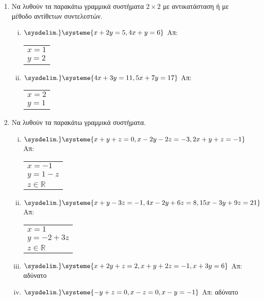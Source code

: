 \documentclass[a4paper,table]{report}
\begin{document}
\begin{center}
  \minibox{\large \bfseries \textcolor{Col1}{Ασκήσεις στα Γραμμικά Συστήματα}}
\end{center}

\vspace{\baselineskip}

\begin{enumerate}

  \item Να λυθούν τα παρακάτω γραμμικά συστήματα $ 2 \times 2 $ με αντικατάσταση ή με 
    μέθοδο αντίθετων συντελεστών.

    \begin{enumerate}[i)]
      \item $ 
      \sysdelim.\}
      \systeme{
        x + 2y = 5, 
        4x + y = 6
      } $ 
      \hfill Απ: 
      \begin{tabular}{l}  
        $x=1 $ \\ 
        $y=2 $ 
      \end{tabular}

    \item $ 
    \sysdelim.\}
    \systeme{
      4x+3y=11,
      5x+7y=17
    } $ 
    \hfill Απ: 
    \begin{tabular}{l}  
      $x=2 $ \\ 
      $y=1 $ 
    \end{tabular}
\end{enumerate}

  \item Να λυθούν τα παρακάτω γραμμικά συστήματα.

    \begin{enumerate}[i)]
      \item $ 
      \sysdelim.\}
      \systeme{
        x+y+z=0,
        x-2y-2z=-3,
        2x+y+z=-1
      } $ 
      \hfill Απ: \begin{tabular}{l}  
        $x=-1 $ \\ 
        $ y=1-z $ \\
        $z \in \mathbb{R}  $
      \end{tabular}

    \item $ 
    \sysdelim.\}
    \systeme{
      x+y-3z=-1,
      4x-2y+6z=8,
      15x-3y+9z=21
    } $ 
    \hfill Απ: \begin{tabular}{l}  
      $x=1 $ \\ 
      $ y=-2+3z $ \\
      $z \in \mathbb{R}  $
    \end{tabular}

  \item $ 
  \sysdelim.\}
  \systeme{
    x+2y+z=2,
    x+y+2z=-1,
    x+3y=6
  } $ 
  \hfill Απ: αδύνατο 

\item $ 
\sysdelim.\}
\systeme{
  -y+z=0,
  x-z=0,
  x-y=-1
} $ 
\hfill Απ: αδύνατο 

\end{enumerate}
\end{enumerate}
\end{document}
